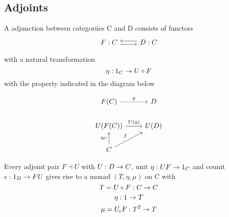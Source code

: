 \documentclass[../../notes.tex]{subfiles}
\begin{document}
\subsection{Adjoints}

\begin{definition}[Adjoint]

  A adjunction between categoriies C and D consists of functors
  \[
    \begin{tikzcd}
      F : C \arrow[r, shift right] & D : C \arrow[l, shift right]
    \end{tikzcd}
  \]

  with a natural transformation
  \[
    \eta : 1_C \rightarrow U \circ F
  \]
  with the property indicated in the diagram below

  \[
    \begin{tikzcd}
      F(C) \arrow[r, dashrightarrow,"g"] & D \\
      U(F(C)) \arrow[r, "U(g)"] & U(D) \\
      C \arrow[u, "\eta_C"] \arrow[ur, "f"]
    \end{tikzcd}
  \]
\end{definition}

  Every adjoint pair $F \dashv U$ with $ U : D \rightarrow C$,
  unit $\eta : UF \rightarrow 1_C$ and counit $\epsilon : 1_D \rightarrow FU$
  gives rise to a monad $(T, \eta, \mu)$ on C with
  \[ T = U \circ F : C \rightarrow C \]
  \[ \eta: 1 \rightarrow T\]
  \[ \mu = U_{\epsilon}F : T^2 \rightarrow T \]
\end{document}
